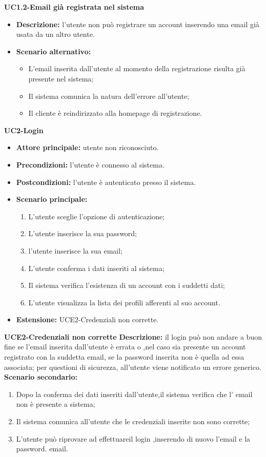 \textbf{UC1.2-Email già registrata nel sistema}
\begin{itemize}
    \item \textbf{Descrizione: }l'utente non può registrare un account inserendo una email già usata da un altro utente.
    \item \textbf{Scenario alternativo:}
    \begin{itemize}
        \item L'email inserita dall'utente al momento della registrazione risulta già presente nel sistema;
        \item Il sistema comunica la natura dell'errore all'utente;
        \item Il cliente è reindirizzato alla homepage di registrazione.
    \end{itemize}
\end{itemize}
\break

\textbf{UC2-Login}
\begin{itemize}
\item \textbf{Attore principale:} utente non riconosciuto.
\item \textbf{Precondizioni:} l'utente è connesso al sistema.
\item \textbf{Postcondizioni:} l'utente è autenticato presso il sistema.
\item \textbf{Scenario principale:}
\begin{enumerate}
    \item L'utente sceglie l'opzione di autenticazione;
    \item L'utente inserisce la sua password;
    \item l'utente inserisce la sua email;
    \item L'utente conferma i dati inseriti al sistema;
    \item Il sistema verifica l'esistenza di un account con i suddetti dati;
    \item L'utente visualizza la lista dei profili afferenti al suo account.
\end{enumerate}
    \item \textbf{Estensione: }UCE2-Credenziali non corrette.
\end{itemize}

\textbf{UCE2-Credenziali non corrette}
\textbf{Descrizione: }il login può non andare a buon fine se l'email inserita dall'utente è errata
o ,nel caso sia presente un account registrato con la suddetta email, se la password inserita non è quella
ad essa associata; per questioni di sicurezza, all'utente viene notificato un errore generico.
\textbf{Scenario secondario:}
\begin{enumerate}
    \item Dopo la conferma dei dati inseriti dall'utente,il sistema verifica 
    che l' email non è presente a sistema;
    \item Il sistema comunica all'utente che le credenziali inserite non sono corrette;
    \item L'utente può riprovare ad effettuareil login ,inserendo di nuovo l'email e la password.
    email.
\end{enumerate}
